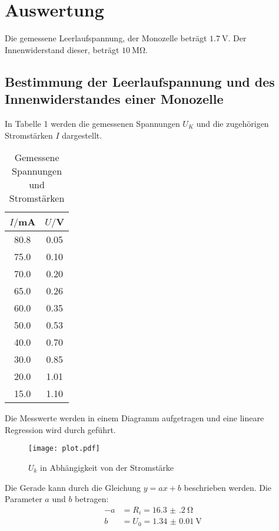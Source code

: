 \section{Auswertung}
\label{sec:Auswertung}

Die gemessene Leerlaufspannung, der Monozelle beträgt $\SI{1.7}{\volt}$. Der Innenwiderstand dieser, beträgt $\SI{10}{\mega\ohm}$.

\subsection{Bestimmung der Leerlaufspannung und des Innenwiderstandes einer Monozelle}

In Tabelle 1 werden die gemessenen Spannungen $U_K$ und die zugehörigen Stromstärken $I$ dargestellt.

\begin{table}[H]
  \centering
  \caption{Gemessene Spannungen und Stromstärken}
  \label{tab:spannung1}
  \begin{tabular}{c c}
    \toprule
    $I/$mA & $U/$V \\
    \midrule
    80.8  &  0.05 \\
    75.0  &  0.10 \\
    70.0  &  0.20 \\
    65.0  &  0.26 \\
    60.0  &  0.35 \\
    50.0  &  0.53 \\
    40.0  &  0.70 \\
    30.0  &  0.85 \\
    20.0  &  1.01 \\
    15.0  &  1.10 \\
    \bottomrule
  \end{tabular}
\end{table}

Die Messwerte werden in einem Diagramm aufgetragen und eine lineare Regression wird durch geführt.


\begin{figure}[H]
  \centering
  \texttt{[image: plot.pdf]}
  \caption{$U_k$ in Abhängigkeit von der Stromstärke}
  \label{fig:plot}
\end{figure}

Die Gerade kann durch die Gleichung $y = ax + b$ beschrieben werden. Die Parameter $a$ und $b$ betragen:
\begin{align*}
  -a &= R_i = \SI{16.3(2)}{\ohm} \\
  b &= U_0 = \SI{1.34(1)}{\volt}
\end{align*}

